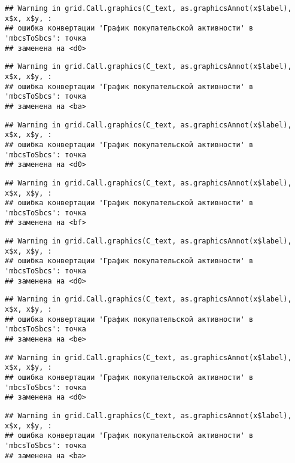 \documentclass[
]{article}
\begin{document}
\begin{verbatim}
## Warning in grid.Call.graphics(C_text, as.graphicsAnnot(x$label), x$x, x$y, :
## ошибка конвертации 'График покупательской активности' в 'mbcsToSbcs': точка
## заменена на <d0>
\end{verbatim}

\begin{verbatim}
## Warning in grid.Call.graphics(C_text, as.graphicsAnnot(x$label), x$x, x$y, :
## ошибка конвертации 'График покупательской активности' в 'mbcsToSbcs': точка
## заменена на <ba>
\end{verbatim}

\begin{verbatim}
## Warning in grid.Call.graphics(C_text, as.graphicsAnnot(x$label), x$x, x$y, :
## ошибка конвертации 'График покупательской активности' в 'mbcsToSbcs': точка
## заменена на <d0>
\end{verbatim}

\begin{verbatim}
## Warning in grid.Call.graphics(C_text, as.graphicsAnnot(x$label), x$x, x$y, :
## ошибка конвертации 'График покупательской активности' в 'mbcsToSbcs': точка
## заменена на <bf>
\end{verbatim}

\begin{verbatim}
## Warning in grid.Call.graphics(C_text, as.graphicsAnnot(x$label), x$x, x$y, :
## ошибка конвертации 'График покупательской активности' в 'mbcsToSbcs': точка
## заменена на <d0>
\end{verbatim}

\begin{verbatim}
## Warning in grid.Call.graphics(C_text, as.graphicsAnnot(x$label), x$x, x$y, :
## ошибка конвертации 'График покупательской активности' в 'mbcsToSbcs': точка
## заменена на <be>
\end{verbatim}

\begin{verbatim}
## Warning in grid.Call.graphics(C_text, as.graphicsAnnot(x$label), x$x, x$y, :
## ошибка конвертации 'График покупательской активности' в 'mbcsToSbcs': точка
## заменена на <d0>
\end{verbatim}

\begin{verbatim}
## Warning in grid.Call.graphics(C_text, as.graphicsAnnot(x$label), x$x, x$y, :
## ошибка конвертации 'График покупательской активности' в 'mbcsToSbcs': точка
## заменена на <ba>
\end{verbatim}
\end{document}
